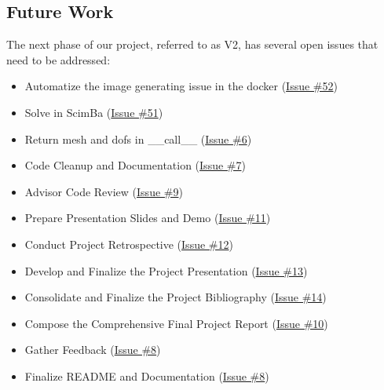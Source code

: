 \documentclass[12pt]{article}
\begin{document}
\newpage

\subsection{Future Work}

The next phase of our project, referred to as V2, has several open issues that need to be addressed:

\begin{itemize}
    \item Automatize the image generating issue in the docker (\href{https://github.com/master-csmi/2024-m1-scimba-feelpp/issues/52}{Issue \#52})
    \item Solve in ScimBa (\href{https://github.com/master-csmi/2024-m1-scimba-feelpp/issues/51}{Issue \#51})
    \item Return mesh and dofs in \_\_call\_\_ (\href{https://github.com/master-csmi/2024-m1-scimba-feelpp/issues/6}{Issue \#6})
    \item Code Cleanup and Documentation (\href{https://github.com/master-csmi/2024-m1-scimba-feelpp/issues/7}{Issue \#7})
    \item Advisor Code Review (\href{https://github.com/master-csmi/2024-m1-scimba-feelpp/issues/9}{Issue \#9})
    \item Prepare Presentation Slides and Demo (\href{https://github.com/master-csmi/2024-m1-scimba-feelpp/issues/11}{Issue \#11})
    \item Conduct Project Retrospective (\href{https://github.com/master-csmi/2024-m1-scimba-feelpp/issues/12}{Issue \#12})
    \item Develop and Finalize the Project Presentation (\href{https://github.com/master-csmi/2024-m1-scimba-feelpp/issues/13}{Issue \#13})
    \item Consolidate and Finalize the Project Bibliography (\href{https://github.com/master-csmi/2024-m1-scimba-feelpp/issues/14}{Issue \#14})
    \item Compose the Comprehensive Final Project Report (\href{https://github.com/master-csmi/2024-m1-scimba-feelpp/issues/10}{Issue \#10})
    \item Gather Feedback (\href{https://github.com/master-csmi/2024-m1-scimba-feelpp/issues/8}{Issue \#8})
    \item Finalize README and Documentation (\href{https://github.com/master-csmi/2024-m1-scimba-feelpp/issues/8}{Issue \#8})
\end{itemize}
\end{document}
